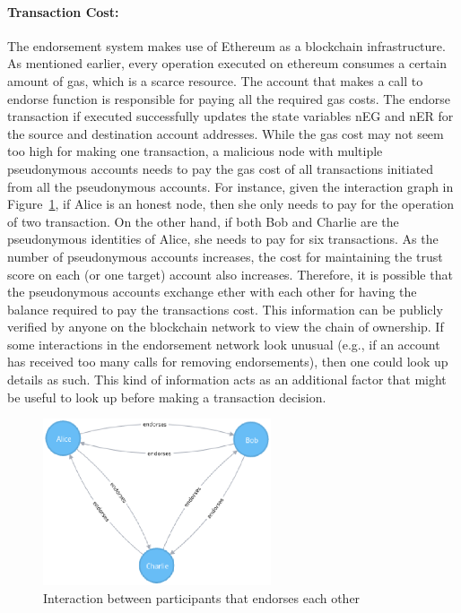 \paragraph{Transaction Cost:}The endorsement system makes use of Ethereum as a
blockchain infrastructure. As mentioned earlier, every operation executed on
ethereum consumes a certain amount of gas, which is a scarce resource. The account that makes a call to endorse function is responsible for paying all the
required gas costs. The endorse transaction if executed successfully updates
the state variables \ac{nEG} and \ac{nER} for the source and destination
account addresses. While the gas cost may not seem too high for making one
transaction, a malicious node with multiple pseudonymous accounts needs to pay
the gas cost of all transactions initiated from all the pseudonymous accounts.
For instance, given the interaction graph in Figure~\ref{fig:subgraphexample}, if
Alice is an honest node, then she only needs to pay for the operation of two 
transaction. On the other hand, if both Bob and Charlie are the pseudonymous
identities of Alice, she needs to pay for six transactions. As the number of
pseudonymous accounts increases, the cost for maintaining the trust score on
each (or one target) account also increases. Therefore, it is possible
that the pseudonymous accounts exchange ether with each other for having the
balance required to pay the transactions cost. This information can be publicly
verified by anyone on the blockchain network to view the chain of ownership. If
some interactions in the endorsement network look unusual (e.g., if an account
has received too many calls for removing endorsements), then one could look up
details as such. This kind of information acts as an additional factor that
might be useful to look up before making a transaction decision. 
\begin{figure}
	\centering
	\includegraphics[width=0.6\textwidth ]{Images/subgraphexample.eps}
	\caption{Interaction between participants that endorses each other}
	\label{fig:subgraphexample}
\end{figure}
